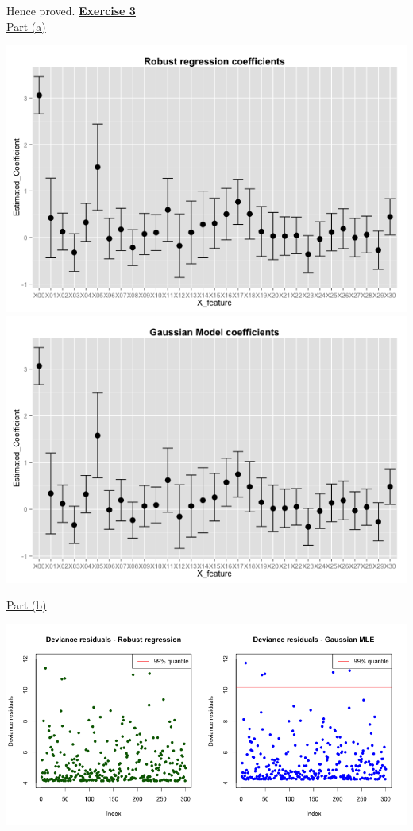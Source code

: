 \documentclass[a4paper, 11pt]{article}
\begin{document}
Hence proved.
\newpage
\textbf{\underline{Exercise 3}}\\
\newline \underline{Part (a)}\\
\begin{center}
\includegraphics[scale=0.5]{ps6_plot1_1.png}\\
\includegraphics[scale=0.5]{ps6_plot1_2.png}
\end{center}
\underline{Part (b)}\\
\begin{center}
\includegraphics[scale=0.6]{ps6_plot2.png}
\end{center}
\end{document}
